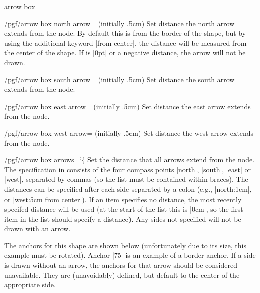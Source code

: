 \begin{shape}{arrow box}
\begin{key}{/pgf/arrow box north arrow= (initially .5cm)}
  Set distance the north arrow extends from the node. By default this
  is from the border of the shape, but by using the additional keyword
  |from center|, the distance will be measured from the center of the
  shape. If  is |0pt| or a negative distance, the arrow
  will not be drawn.
\end{key}

\begin{key}{/pgf/arrow box south arrow= (initially .5cm)}
	Set distance the south arrow extends from the node.
\end{key}

\begin{key}{/pgf/arrow box east arrow= (initially .5cm)}
	Set distance the east arrow extends from the node.
\end{key}

\begin{key}{/pgf/arrow box west arrow= (initially .5cm)}
	Set distance the west arrow extends from the node.
\end{key}

\begin{key}{/pgf/arrow box arrows={\ttfamily\char`\{}}
  Set the distance that all arrows extend from the node. The 
  specification in  consists of the four compass points
  |north|, |south|, |east| or |west|, separated by commas (so the list
  must be contained within braces). 
  The distances can be specified after each side separated by a colon 
  (e.g., |north:1cm|, or |west:5cm from center|). 
  If an item specifies no distance, the most recently specifed 
  distance will be used (at the start of the list this is |0cm|,
  so the first item in the list should specify a distance). 
  Any sides not specified will not be drawn with an arrow.
\end{key}

The anchors for this shape are shown below (unfortunately due to its
size, this example must be rotated). Anchor |75| is an example of a
border anchor.
If a side is drawn without an arrow, the anchors for that arrow should 
be considered unavailable. They are (unavoidably) defined, but default 
to the center of the appropriate side.


\end{shape}
